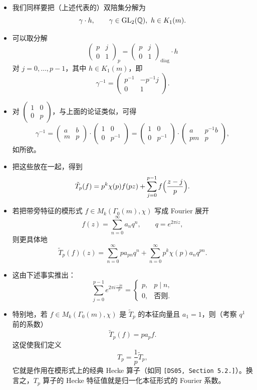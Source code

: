 \begin{itemize}
\[\]
\item 我们同样要把（上述代表的）双陪集分解为
\[
\gamma\cdot h,\qquad \gamma\in\operatorname{GL}_2(\mathbb{Q}),\ h\in K_1(m).
\]
\item 可以取分解
\[
\begin{pmatrix}p&j\\0&1\end{pmatrix}_p
=\begin{pmatrix}p&j\\0&1\end{pmatrix}_{\mathrm{diag}}\cdot h
\]
对 $j=0,\dots,p-1$，其中 $h\in K_1(m)$，即
\[
\gamma^{-1}=\begin{pmatrix}p^{-1}&-p^{-1}j\\0&1\end{pmatrix}.
\]
\item 对 $\begin{pmatrix}1&0\\0&p\end{pmatrix}$，与上面的论证类似，可得
\[
\gamma^{-1}=\begin{pmatrix}a&b\\m&p\end{pmatrix}\cdot\begin{pmatrix}1&0\\0&p^{-1}\end{pmatrix}
=\begin{pmatrix}1&0\\0&p^{-1}\end{pmatrix}\cdot\begin{pmatrix}a&p^{-1}b\\pm&p\end{pmatrix},
\]
如所欲。
\item 把这些放在一起，得到
\[
\tilde T_p(f)=p^k\chi(p)f(pz)+\sum_{j=0}^{p-1}f\Bigl(\frac{z-j}{p}\Bigr).
\]
\item 若把带旁特征的模形式 $f\in M_k(\Gamma_0(m),\chi)$ 写成 Fourier 展开
\[
f(z)=\sum_{n=0}^\infty a_nq^n,\qquad q=e^{2\pi iz},
\]
则更具体地
\[
\tilde T_p(f)(z)=\sum_{n=0}^\infty pa_{pn}q^n+\sum_{n=0}^\infty p^k\chi(p)a_nq^{pn}.
\]
\item 这由下述事实推出：
\[
\sum_{j=0}^{p-1}e^{2\pi i\frac{-jn}{p}}=
\begin{cases}
p,&p\mid n,\\
0,&\text{否则}.
\end{cases}
\]
\item 特别地，若 $f\in M_k(\Gamma_0(m),\chi)$ 是 $\tilde T_p$ 的本征向量且 $a_1=1$，则（考察 $q^1$ 前的系数）
\[
\tilde T_p(f)=pa_pf.
\]
这促使我们定义
\[
T_p=\frac1p\tilde T_p,
\]
它就是作用在模形式上的经典 Hecke 算子（如同 \texttt{[DS05, Section 5.2.]}）。换言之，$T_p$ 算子的 Hecke 特征值就是归一化本征形式的 Fourier 系数。
\end{itemize}

